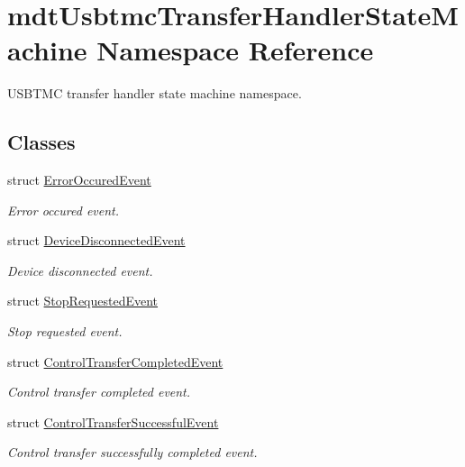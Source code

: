 \hypertarget{namespacemdt_usbtmc_transfer_handler_state_machine}{\section{mdt\-Usbtmc\-Transfer\-Handler\-State\-Machine Namespace Reference}
\label{namespacemdt_usbtmc_transfer_handler_state_machine}
}


U\-S\-B\-T\-M\-C transfer handler state machine namespace.  


\subsection*{Classes}
\begin{DoxyCompactItemize}
\item 
struct \hyperlink{structmdt_usbtmc_transfer_handler_state_machine_1_1_error_occured_event}{Error\-Occured\-Event}
\begin{DoxyCompactList}\small\item\em Error occured event. \end{DoxyCompactList}\item 
struct \hyperlink{structmdt_usbtmc_transfer_handler_state_machine_1_1_device_disconnected_event}{Device\-Disconnected\-Event}
\begin{DoxyCompactList}\small\item\em Device disconnected event. \end{DoxyCompactList}\item 
struct \hyperlink{structmdt_usbtmc_transfer_handler_state_machine_1_1_stop_requested_event}{Stop\-Requested\-Event}
\begin{DoxyCompactList}\small\item\em Stop requested event. \end{DoxyCompactList}\item 
struct \hyperlink{structmdt_usbtmc_transfer_handler_state_machine_1_1_control_transfer_completed_event}{Control\-Transfer\-Completed\-Event}
\begin{DoxyCompactList}\small\item\em Control transfer completed event. \end{DoxyCompactList}\item 
struct \hyperlink{structmdt_usbtmc_transfer_handler_state_machine_1_1_control_transfer_successful_event}{Control\-Transfer\-Successful\-Event}
\begin{DoxyCompactList}\small\item\em Control transfer successfully completed event. \end{DoxyCompactList}\item 

\end{DoxyCompactItemize}
